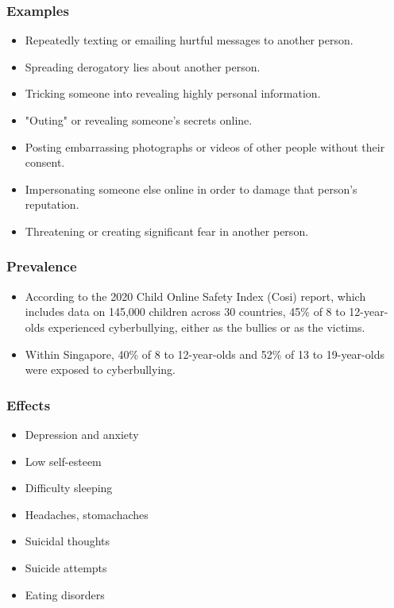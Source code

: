 \documentclass[11pt]{article}
\begin{document}
\subsubsection{Examples}
\label{sec:org61ac06c}
\begin{itemize}
\item Repeatedly texting or emailing hurtful messages to another person.
\item Spreading derogatory lies about another person.
\item Tricking someone into revealing highly personal information.
\item "Outing" or revealing someone's secrets online.
\item Posting embarrassing photographs or videos of other people without their consent.
\item Impersonating someone else online in order to damage that person's reputation.
\item Threatening or creating significant fear in another person.
\end{itemize}
\subsubsection{Prevalence}
\label{sec:orgefc5e04}
\begin{itemize}
\item According to the 2020 Child Online Safety Index (Cosi) report, which includes data on 145,000 children across 30 countries, 45\% of 8 to 12-year-olds experienced cyberbullying, either as the bullies or as the victims.
\item Within Singapore, 40\% of 8 to 12-year-olds and 52\% of 13 to 19-year-olds were exposed to cyberbullying.
\end{itemize}
\subsubsection{Effects}
\label{sec:org30ffdde}
\begin{itemize}
\item Depression and anxiety
\item Low self-esteem
\item Difficulty sleeping
\item Headaches, stomachaches
\item Suicidal thoughts
\item Suicide attempts
\item Eating disorders
\end{itemize}
\end{document}
